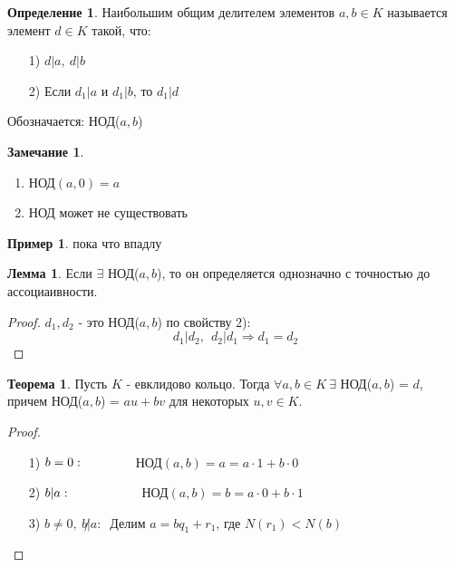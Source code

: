 \documentclass[a4paper, 12pt]{article}
\newcommand\tab[1][.5cm]{\hspace*{#1}}
\theoremstyle{definition}
\newtheorem*{definition}{Определение}
\newtheorem*{theorem}{Теорема}
\newtheorem*{lemma}{Лемма}
\newtheorem*{remark}{Замечание}
\newtheorem*{example1}{Пример}
\begin{document}
    \begin{definition}
      Наибольшим общим делителем элементов $a,b \in K$ называется элемент $d \in K$ такой, что: 
      \begin{enumerate}
        \item[1)] $d|a, \ d|b$
        \item[2)] Если $d_1|a$ и $d_1|b$, то $d_1|d$     
      \end{enumerate}
      Обозначается: НОД($a,b$) 
    \end{definition}
    \begin{remark}\tab
      \begin{enumerate}
        \item НОД$(a,0) = a$
        \item НОД может не существовать
      \end{enumerate}
    \end{remark}
    \begin{example1}
      пока что впадлу
    \end{example1}
    \begin{lemma}
      Если $\exists$ НОД($a,b$), то он определяется однозначно с точностью до ассоциаивности.
    \end{lemma}
    \begin{proof}
      $d_1, d_2$ - это НОД($a,b$) по свойству 2): 
      $$d_1|d_2, \ \ d_2|d_1 \Longrightarrow d_1 = d_2$$   
    \end{proof}
    \begin{theorem}
      Пусть $K$ - евклидово кольцо. Тогда $\forall a, b \in K \ \exists$ НОД($a,b$) = $d$, причем НОД($a,b$) = $au + bv$ для некоторых $u, v \in K$.     
    \end{theorem}
    \begin{proof}\tab
      \begin{itemize}
        \item[1)] $b = 0: \ \tab[1.27cm] $ НОД$(a,b) = a = a \cdot 1 + b \cdot 0$
        \item[2)] $b|a: \ \tab[1.8cm] $ НОД$(a,b) = b = a \cdot 0 + b \cdot 1$
        \item[3)] $b \neq 0, \ b\not |a: \ $  Делим $a = bq_1 + r_1$, где $N(r_1) < N(b)$   
      \end{itemize}
      
    \end{proof}  


    
         
   


\end{document}

